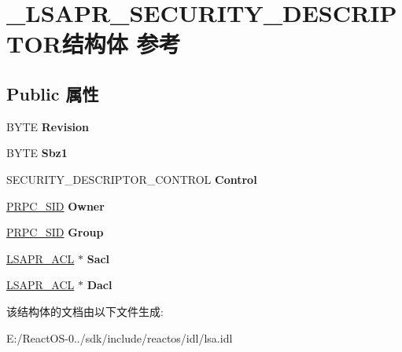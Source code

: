 \hypertarget{struct___l_s_a_p_r___s_e_c_u_r_i_t_y___d_e_s_c_r_i_p_t_o_r}{}\section{\+\_\+\+L\+S\+A\+P\+R\+\_\+\+S\+E\+C\+U\+R\+I\+T\+Y\+\_\+\+D\+E\+S\+C\+R\+I\+P\+T\+O\+R结构体 参考}
\label{struct___l_s_a_p_r___s_e_c_u_r_i_t_y___d_e_s_c_r_i_p_t_o_r}
\subsection*{Public 属性}
\begin{DoxyCompactItemize}
\item 
\mbox{\label{struct___l_s_a_p_r___s_e_c_u_r_i_t_y___d_e_s_c_r_i_p_t_o_r_ad9ad705648ed279d7ea7904c68244979}} 
B\+Y\+TE {\bfseries Revision}
\item 
\mbox{\label{struct___l_s_a_p_r___s_e_c_u_r_i_t_y___d_e_s_c_r_i_p_t_o_r_ad3a32dc6f1ec630e85cf531b6465c7de}} 
B\+Y\+TE {\bfseries Sbz1}
\item 
\mbox{\label{struct___l_s_a_p_r___s_e_c_u_r_i_t_y___d_e_s_c_r_i_p_t_o_r_a35f74ae168848a97e6c5f4f42f08c838}} 
S\+E\+C\+U\+R\+I\+T\+Y\+\_\+\+D\+E\+S\+C\+R\+I\+P\+T\+O\+R\+\_\+\+C\+O\+N\+T\+R\+OL {\bfseries Control}
\item 
\mbox{\label{struct___l_s_a_p_r___s_e_c_u_r_i_t_y___d_e_s_c_r_i_p_t_o_r_a67c2b8c2eff568555885165a6594a734}} 
\hyperlink{struct___r_p_c___s_i_d}{P\+R\+P\+C\+\_\+\+S\+ID} {\bfseries Owner}
\item 
\mbox{\label{struct___l_s_a_p_r___s_e_c_u_r_i_t_y___d_e_s_c_r_i_p_t_o_r_ac6a0d8965906ec26f8ef808bcf94fce5}} 
\hyperlink{struct___r_p_c___s_i_d}{P\+R\+P\+C\+\_\+\+S\+ID} {\bfseries Group}
\item 
\mbox{\label{struct___l_s_a_p_r___s_e_c_u_r_i_t_y___d_e_s_c_r_i_p_t_o_r_ad06e953843035d6f11543864d19aa3a3}} 
\hyperlink{struct___l_s_a_p_r___a_c_l}{L\+S\+A\+P\+R\+\_\+\+A\+CL} $\ast$ {\bfseries Sacl}
\item 
\mbox{\label{struct___l_s_a_p_r___s_e_c_u_r_i_t_y___d_e_s_c_r_i_p_t_o_r_a4e5f128e4b1fa7c2ad68d069d8297fad}} 
\hyperlink{struct___l_s_a_p_r___a_c_l}{L\+S\+A\+P\+R\+\_\+\+A\+CL} $\ast$ {\bfseries Dacl}
\end{DoxyCompactItemize}


该结构体的文档由以下文件生成\+:\begin{DoxyCompactItemize}
\item 
E\+:/\+React\+O\+S-\/0../sdk/include/reactos/idl/lsa.\+idl\end{DoxyCompactItemize}

